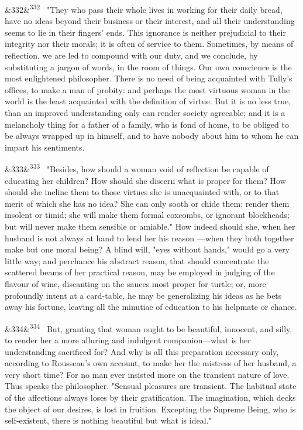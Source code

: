 \documentclass[12pt]{article}
\newcommand{\para}[1][]{\par\noindent\ifx&#1&\else\textsuperscript{\footnotesize #1}~\fi}
\begin{document}
\para[332] "They who pass their whole lives in working for their daily bread, have no ideas beyond their business or their interest, and all their understanding seems to lie in their fingers' ends. This ignorance is neither prejudicial to their integrity nor their morals; it is often of service to them. Sometimes, by means of reflection, we are led to compound with our duty, and we conclude, by substituting a jargon of words, in the room of things. Our own conscience is the most enlightened philosopher. There is no need of being acquainted with Tully's offices, to make a man of probity: and perhaps the most virtuous woman in the world is the least acquainted with the definition of virtue. But it is no less true, than an improved understanding only can render society agreeable; and it is a melancholy thing for a father of a family, who is fond of home, to be obliged to be always wrapped up in himself, and to have nobody about him to whom he can impart his sentiments.

\para[333] "Besides, how should a woman void of reflection be capable of educating her children? How should she discern what is proper for them? How should she incline them to those virtues she is unacquainted with, or to that merit of which she has no idea? She can only sooth or chide them; render them insolent or timid; she will make them formal coxcombs, or ignorant blockheads; but will never make them sensible or amiable." How indeed should she, when her husband is not always at hand to lend her his reason ---when they both together make but one moral being? A blind will, "eyes without hands," would go a very little way; and perchance his abstract reason, that should concentrate the scattered beams of her practical reason, may be employed in judging of the flavour of wine, discanting on the sauces most proper for turtle; or, more profoundly intent at a card-table, he may be generalizing his ideas as he bets away his fortune, leaving all the minutiae of education to his helpmate or chance.

\para[334] But, granting that woman ought to be beautiful, innocent, and silly, to render her a more alluring and indulgent companion---what is her understanding sacrificed for? And why is all this preparation necessary only, according to Rousseau's own account, to make her the mistress of her husband, a very short time? For no man ever insisted more on the transient nature of love. Thus speaks the philosopher. "Sensual pleasures are transient. The habitual state of the affections always loses by their gratification. The imagination, which decks the object of our desires, is lost in fruition. Excepting the Supreme Being, who is self-existent, there is nothing beautiful but what is ideal."
\end{document}
